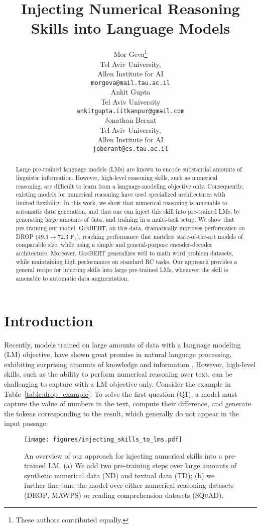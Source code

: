 \documentclass[11pt,a4paper]{article}
\author{Mor Geva\thanks{These authors contributed equally.} \\
  Tel Aviv University, \\
  Allen Institute for AI \\
  {\tt morgeva@mail.tau.ac.il} \\\And
  Ankit Gupta\footnotemark[1] \\
  Tel Aviv University \\
  {\tt ankitgupta.iitkanpur@gmail.com} \\\AND
  Jonathan Berant \\
  Tel Aviv University, \\
  Allen Institute for AI \\
  {\tt joberant@cs.tau.ac.il} \\}
\title{Injecting Numerical Reasoning Skills into Language Models}
\date{}
\newcommand\genbert{\textsc{GenBERT}}
\newcommand\drop{\textsc{DROP}}
\newcommand\squad{\textsc{SQuAD}}
\begin{document}
\maketitle

\begin{abstract}
Large pre-trained language models (LMs) are known to encode
  substantial amounts of linguistic information. However, high-level reasoning
  skills, such as numerical reasoning, are difficult to learn from a
  language-modeling objective only. Consequently, existing models for numerical reasoning
  have used specialized architectures with limited flexibility. In this work, we
  show that numerical reasoning is amenable to automatic data generation, and thus one can inject this skill into pre-trained LMs, by generating large amounts of data, and training in
  a multi-task setup. 
  We show that pre-training our model, \genbert{}, on this data, dramatically improves performance on \drop{} ($49.3 \rightarrow 72.3$ F$_1$), reaching performance that matches state-of-the-art models of comparable size, while using a simple and general-purpose encoder-decoder architecture. Moreover, \genbert{} generalizes well to math word problem datasets, while maintaining high performance on standard RC tasks. Our approach provides a general recipe for injecting skills into large pre-trained LMs, whenever the skill is amenable to automatic data augmentation.
\end{abstract}
 \section{Introduction}
Recently, models trained on large amounts of data with a language modeling (LM) objective, have shown great promise in natural language processing, exhibiting surprising amounts of knowledge and information \cite{peters2018elmo, devlin2018bert, liu2019roberta, lan2019albert, petroni2019language, hewitt2019structural}. However, high-level skills, such as the ability to perform numerical reasoning over text, can be challenging to capture with a LM objective only. Consider the example in Table~\ref{table:drop_example}. To solve the first question (Q1), a model must capture the value of numbers in the text, compute their difference, and generate the tokens corresponding to the result, which generally do not appear in the input passage.

\begin{figure}\setlength{\belowcaptionskip}{-18pt}
    \centering
    \texttt{[image: figures/injecting\_skills\_to\_lms.pdf]}
    \caption{An overview of our approach for injecting numerical skills into a pre-trained LM. (a) We add two pre-training steps over large amounts of synthetic numerical data (ND) and textual data (TD); (b) we further fine-tune the model over either numerical reasoning datasets (\drop, \textsc{MAWPS}) or reading comprehension datasets (\squad).}
    \label{figure:intro}
\end{figure}
\end{document}

